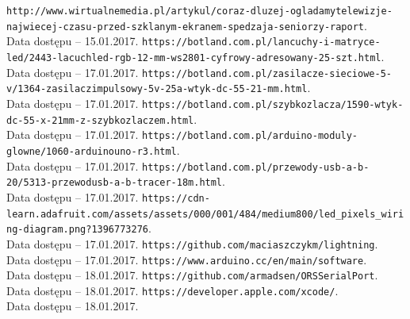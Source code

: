 \documentclass[12pt]{report}
\begin{document}
\begin{thebibliography}{99}
 {\tt http://www.wirtualnemedia.pl/artykul/coraz-dluzej-ogladamy\-telewizje-najwiecej-czasu-przed-szklanym-ekranem-spedzaja\--seniorzy-raport}.\\Data dostępu -- 15.01.2017.
 {\tt https://botland.com.pl/lancuchy-i-matryce-led/2443-lacuch\-led-rgb-12-mm-ws2801-cyfrowy-adresowany-25-szt.html}.\\Data dostępu -- 17.01.2017.
 {\tt https://botland.com.pl/zasilacze-sieciowe-5-v/1364-zasilacz\-impulsowy-5v-25a-wtyk-dc-55-21-mm.html}.\\Data dostępu -- 17.01.2017.
 {\tt https://botland.com.pl/szybkozlacza/1590-wtyk-dc-55-x-21\-mm-z-szybkozlaczem.html}.\\Data dostępu -- 17.01.2017.
 {\tt https://botland.com.pl/arduino-moduly-glowne/1060-arduino\-uno-r3.html}.\\Data dostępu -- 17.01.2017.
 {\tt https://botland.com.pl/przewody-usb-a-b-20/5313-przewod\-usb-a-b-tracer-18m.html}.\\Data dostępu -- 17.01.2017.
 {\tt https://cdn-learn.adafruit.com/assets/assets/000/001/484/\-medium800/led\_pixels\_wiring-diagram.png?1396773276}.\\Data dostępu -- 17.01.2017.
 {\tt https://github.com/maciaszczykm/lightning}.\\Data dostępu -- 17.01.2017.
 {\tt https://www.arduino.cc/en/main/software}.\\Data dostępu -- 18.01.2017.
 {\tt https://github.com/armadsen/ORSSerialPort}.\\Data dostępu -- 18.01.2017.
 {\tt https://developer.apple.com/xcode/}.\\Data dostępu -- 18.01.2017.
\end{thebibliography}

\listoffigures

\listoftables

\lstlistoflistings
\end{document}
